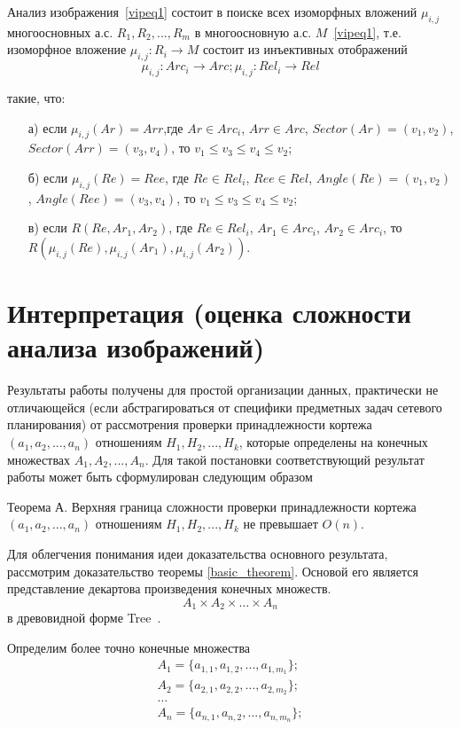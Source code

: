 Анализ изображения~\ref{vipeq1} состоит в поиске всех изоморфных вложений ${ \mu_{i,j} }$ многоосновных а.с. $R_1,R_2,...,R_m$ в многоосновную а.с. $M$~\ref{vipeq1}, т.е. изоморфное вложение $\mu_{i,j} : R_i \rightarrow M$ состоит из инъективных отображений
\begin{equation}
\mu_{i,j} : Arc_i \rightarrow Arc; \mu_{i,j} : Rel_i \rightarrow Rel
\label{vipeq4}
\end{equation}

такие, что:

\begin{enumerate}
\item[а)] если $\mu_{i,j}(Ar) = Arr$,где $Ar \in Arc_i$, $Arr \in Arc$, $Sector(Ar) = (v_1, v_2)$, $Sector(Arr) = (v_3, v_4)$, то $v_1 \le v_3 \le v_4 \le v_2$;
\item[б)] если $\mu_{i,j}(Re) = Ree$, где $Re \in Rel_i$, $Ree \in Rel$, $Angle(Re) = (v_1, v_2)$, $Angle(Ree) = (v_3, v_4)$, то $v_1 \le v_3 \le v_4 \le v_2$;
\item[в)] если $R(Re, Ar_1, Ar_2)$, где $Re \in Rel_i$, $Ar_1 \in Arc_i$, $Ar_2 \in Arc_i$, то $R(\mu_{i,j}(Re), \mu_{i,j}(Ar_1), \mu_{i,j}(Ar_2))$.
\end{enumerate}

\section{Интерпретация (оценка сложности анализа изображений)}
Результаты  работы \cite{Samara} получены для простой организации данных, практически не отличающейся (если абстрагироваться от специфики предметных задач сетевого планирования) от рассмотрения проверки принадлежности кортежа $(a_1,  a_2, ..., a_n)$   отношениям $H_1, H_2, ... , H_k$,  которые определены на конечных множествах $A_1,  A_2, ..., A_n$.
Для такой постановки соответствующий результат работы \cite{Samara}   может быть сформулирован следующим образом
\begin{theorem}
Теорема А.  Верхняя граница сложности проверки принадлежности кортежа 
$(a_1,  a_2, ..., a_n)$  отношениям $H_1, H_2, ... , H_k$  не превышает  $O(n)$.
\label{basic_theorem}
\end{theorem}
Для облегчения понимания идеи доказательства основного результата, рассмотрим доказательство теоремы \ref{basic_theorem}. Основой его является представление декартова произведения конечных множеств.
$$A_1 \times A_2 \times \ldots \times A_n$$
в древовидной форме Tree~\cite{D9}.

Определим более точно конечные множества 
\begin{equation}
\begin{array}{c}
A_1 = \{a_{1,1}, a_{1,2}, ..., a_{1,m_1}\}; \\
A_2 = \{ a_{2,1}, a_{2,2}, ..., a_{2,m_2}\}; \\
\dots \\
A_n = \{ a_{n,1}, a_{n,2}, ..., a_{n,m_n}\}; \\
\end{array}
\end{equation}

